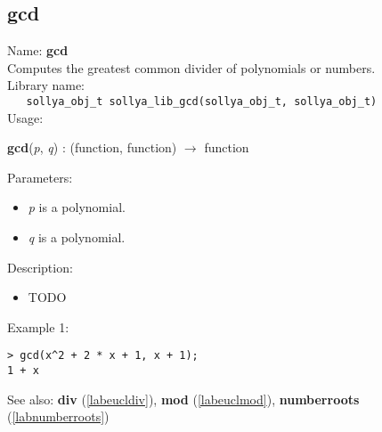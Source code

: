 \subsection{gcd}
\label{labgcd}
\noindent Name: \textbf{gcd}\\
\phantom{aaa}Computes the greatest common divider of polynomials or numbers.\\[0.2cm]
\noindent Library name:\\
\verb|   sollya_obj_t sollya_lib_gcd(sollya_obj_t, sollya_obj_t)|\\[0.2cm]
\noindent Usage: 
\begin{center}
\textbf{gcd}(\emph{p}, \emph{q}) : (\textsf{function}, \textsf{function}) $\rightarrow$ \textsf{function}\\
\end{center}
Parameters: 
\begin{itemize}
\item \emph{p} is a polynomial.
\item \emph{q} is a polynomial.
\end{itemize}
\noindent Description: \begin{itemize}

\item TODO
\end{itemize}
\noindent Example 1: 
\begin{center}\begin{minipage}{15cm}\begin{Verbatim}[frame=single]
> gcd(x^2 + 2 * x + 1, x + 1);
1 + x
\end{Verbatim}
\end{minipage}\end{center}
See also: \textbf{div} (\ref{labeucldiv}), \textbf{mod} (\ref{labeuclmod}), \textbf{numberroots} (\ref{labnumberroots})
